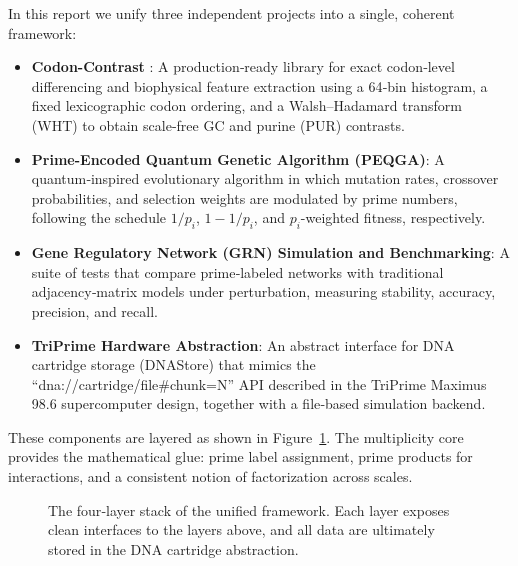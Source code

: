 \documentclass[12pt]{article}
\begin{document}
In this report we unify three independent projects into a single, coherent framework:
\begin{itemize}
    \item \textbf{Codon-Contrast} \cite{vanGelder2025}: A production‑ready library for exact codon‑level differencing and biophysical feature extraction using a 64‑bin histogram, a fixed lexicographic codon ordering, and a Walsh–Hadamard transform (WHT) to obtain scale‑free GC and purine (PUR) contrasts.
    \item \textbf{Prime-Encoded Quantum Genetic Algorithm (PEQGA)}: A quantum‑inspired evolutionary algorithm in which mutation rates, crossover probabilities, and selection weights are modulated by prime numbers, following the schedule $1/p_i$, $1-1/p_i$, and $p_i$-weighted fitness, respectively.
    \item \textbf{Gene Regulatory Network (GRN) Simulation and Benchmarking}: A suite of tests that compare prime‑labeled networks with traditional adjacency‑matrix models under perturbation, measuring stability, accuracy, precision, and recall.
    \item \textbf{TriPrime Hardware Abstraction}: An abstract interface for DNA cartridge storage (DNAStore) that mimics the ``dna://cartridge/file\#chunk=N'' API described in the TriPrime Maximus 98.6 supercomputer design, together with a file‑based simulation backend.
\end{itemize}
These components are layered as shown in Figure~\ref{fig:stack}. The multiplicity core provides the mathematical glue: prime label assignment, prime products for interactions, and a consistent notion of factorization across scales.

\begin{figure}[h]
\centering
{}
\caption{The four‑layer stack of the unified framework. Each layer exposes clean interfaces to the layers above, and all data are ultimately stored in the DNA cartridge abstraction.}
\label{fig:stack}
\end{figure}
\end{document}
